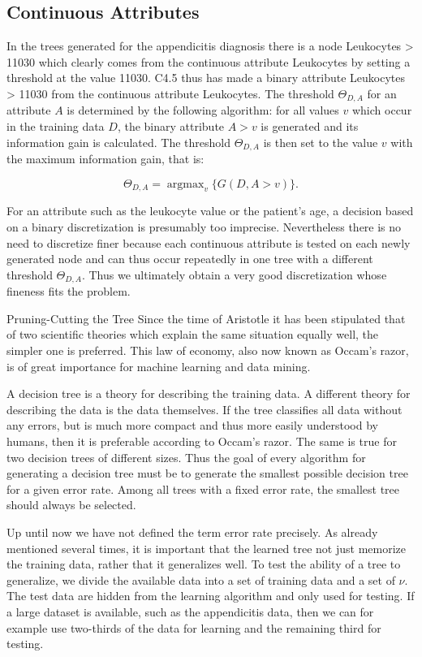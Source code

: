 \documentclass[10pt]{book}
\begin{document}
\subsection{Continuous Attributes}
In the trees generated for the appendicitis diagnosis there is a node Leukocytes > 11030 which clearly comes from the continuous attribute Leukocytes by setting a threshold at the value 11030. C4.5 thus has made a binary attribute Leukocytes > 11030 from the continuous attribute Leukocytes. The threshold $\Theta_{D, A}$ for an attribute $A$ is determined by the following algorithm: for all values $v$ which occur in the training data $D$, the binary attribute $A>v$ is generated and its information gain is calculated. The threshold $\Theta_{D, A}$ is then set to the value $v$ with the maximum information gain, that is:

$$
\Theta_{D, A}=\operatorname{argmax}_{v}\{G(D, A>v)\} .
$$

For an attribute such as the leukocyte value or the patient's age, a decision based on a binary discretization is presumably too imprecise. Nevertheless there is no need to discretize finer because each continuous attribute is tested on each newly generated node and can thus occur repeatedly in one tree with a different threshold $\Theta_{D, A}$. Thus we ultimately obtain a very good discretization whose fineness fits the problem.

Pruning-Cutting the Tree
Since the time of Aristotle it has been stipulated that of two scientific theories which explain the same situation equally well, the simpler one is preferred. This law of economy, also now known as Occam's razor, is of great importance for machine learning and data mining.


A decision tree is a theory for describing the training data. A different theory for describing the data is the data themselves. If the tree classifies all data without any errors, but is much more compact and thus more easily understood by humans, then it is preferable according to Occam's razor. The same is true for two decision trees of different sizes. Thus the goal of every algorithm for generating a decision tree must be to generate the smallest possible decision tree for a given error rate. Among all trees with a fixed error rate, the smallest tree should always be selected.

Up until now we have not defined the term error rate precisely. As already mentioned several times, it is important that the learned tree not just memorize the training data, rather that it generalizes well. To test the ability of a tree to generalize, we divide the available data into a set of training data and a set of $\nu$. The test data are hidden from the learning algorithm and only used for testing. If a large dataset is available, such as the appendicitis data, then we can for example use two-thirds of the data for learning and the remaining third for testing.
\end{document}
